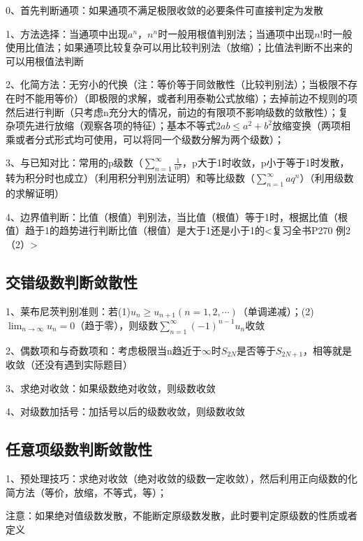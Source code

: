 0、首先判断通项：如果通项不满足极限收敛的必要条件可直接判定为发散

1、方法选择：当通项中出现$ a^n $，$ n^n $时一般用根值判别法；当通项中出现$ n! $时一般使用比值法；如果通项比较复杂可以用比较判别法（放缩）；比值法判断不出来的可以用根值法判断

2、化简方法：无穷小的代换（注：等价等于同敛散性（比较判别法）；当极限不存在时不能用等价）（即极限的求解，或者利用泰勒公式放缩）；去掉前边不规则的项然后进行判断（只考虑n充分大的情况，前边的有限项不影响级数的敛散性）；复杂项先进行放缩（观察各项的特征）；基本不等式$ 2ab \le a^2 + b^2 $放缩变换（两项相乘或者分式形式均可使用，可以将同一个级数分解为两个级数）；

3、与已知对比：常用的p级数（$ \sum_{n=1}^{\infty} \frac 1{n^p} $，p大于1时收敛，p小于等于1时发散，转为积分时也成立）（利用积分判别法证明）和等比级数（$ \sum_{n=1}^{\infty} a{q^n} $）（利用级数的求解证明）

4、边界值判断：比值（根值）判别法，当比值（根值）等于1时，根据比值（根值）趋于1的趋势进行判断比值（根值）是大于1还是小于1的<复习全书P270 例2 （2）>



\subsection{交错级数判断敛散性}

1、莱布尼茨判别准则：若(1)$ u_{n} \geqslant u_{n+1}(n=1,2, \cdots) $（单调递减）；(2)$ \lim_{n \rightarrow \infty} u_{n}=0 $（趋于零），则级数$ \sum_{n=1}^{\infty}(-1)^{n-1} u_{n} $收敛

2、偶数项和与奇数项和：考虑极限当n趋近于$ \infty $时$ S_{2N} $是否等于$ S_{2N+1} $，相等就是收敛（还没有遇到实际题目）

3、求绝对收敛：如果级数绝对收敛，则级数收敛

4、对级数加括号：加括号以后的级数收敛，则级数收敛



\subsection{任意项级数判断敛散性}

1、预处理技巧：求绝对收敛（绝对收敛的级数一定收敛），然后利用正向级数的化简方法（等价，放缩，不等式，等）；

注意：如果绝对值级数发散，不能断定原级数发散，此时要判定原级数的性质或者定义

